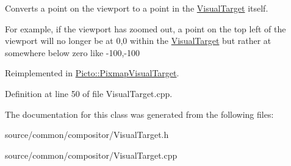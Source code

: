 Converts a point on the viewport to a point in the \hyperlink{class_picto_1_1_visual_target}{Visual\-Target} itself. 

For example, if the viewport has zoomed out, a point on the top left of the viewport will no longer be at 0,0 within the \hyperlink{class_picto_1_1_visual_target}{Visual\-Target} but rather at somewhere below zero like -\/100,-\/100 

Reimplemented in \hyperlink{struct_picto_1_1_pixmap_visual_target_a8f3cb13a38045e2730ac4da01990dd8a}{Picto\-::\-Pixmap\-Visual\-Target}.



Definition at line 50 of file Visual\-Target.\-cpp.



The documentation for this class was generated from the following files\-:\begin{DoxyCompactItemize}
\item 
source/common/compositor/Visual\-Target.\-h\item 
source/common/compositor/Visual\-Target.\-cpp\end{DoxyCompactItemize}
